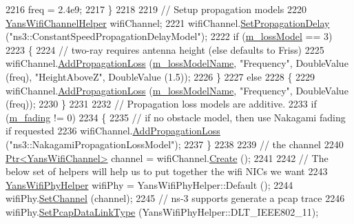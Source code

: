 \begin{DoxyCode}
2216       freq = 2.4e9;
2217     \}
2218 
2219   \textcolor{comment}{// Setup propagation models}
2220   \hyperlink{classns3_1_1YansWifiChannelHelper}{YansWifiChannelHelper} wifiChannel;
2221   wifiChannel.\hyperlink{classns3_1_1YansWifiChannelHelper_a6b452ba53ccaee6ca000cc72ed9ea0fa}{SetPropagationDelay} (\textcolor{stringliteral}{"ns3::ConstantSpeedPropagationDelayModel"});
2222   \textcolor{keywordflow}{if} (\hyperlink{classVanetRoutingExperiment_a6ca0dcdbcabbd60f246855590b4ee4f5}{m\_lossModel} == 3)
2223     \{
2224       \textcolor{comment}{// two-ray requires antenna height (else defaults to Friss)}
2225       wifiChannel.\hyperlink{classns3_1_1YansWifiChannelHelper_a71c64d54e148b43698c65736e1c77156}{AddPropagationLoss} (\hyperlink{classVanetRoutingExperiment_a973b4d1f55f7e425e1564db1cfd503f1}{m\_lossModelName}, \textcolor{stringliteral}{"Frequency"}, 
      DoubleValue (freq), \textcolor{stringliteral}{"HeightAboveZ"}, DoubleValue (1.5));
2226     \}
2227   \textcolor{keywordflow}{else}
2228     \{
2229       wifiChannel.\hyperlink{classns3_1_1YansWifiChannelHelper_a71c64d54e148b43698c65736e1c77156}{AddPropagationLoss} (\hyperlink{classVanetRoutingExperiment_a973b4d1f55f7e425e1564db1cfd503f1}{m\_lossModelName}, \textcolor{stringliteral}{"Frequency"}, 
      DoubleValue (freq));
2230     \}
2231 
2232   \textcolor{comment}{// Propagation loss models are additive.}
2233   \textcolor{keywordflow}{if} (\hyperlink{classVanetRoutingExperiment_acdcef1359860a9bc93e678e15080544f}{m\_fading} != 0)
2234     \{
2235       \textcolor{comment}{// if no obstacle model, then use Nakagami fading if requested}
2236       wifiChannel.\hyperlink{classns3_1_1YansWifiChannelHelper_a71c64d54e148b43698c65736e1c77156}{AddPropagationLoss} (\textcolor{stringliteral}{"ns3::NakagamiPropagationLossModel"});
2237     \}
2238 
2239   \textcolor{comment}{// the channel}
2240   \hyperlink{classns3_1_1Ptr}{Ptr<YansWifiChannel>} channel = wifiChannel.\hyperlink{classns3_1_1YansWifiChannelHelper_a0532e292ab9452f3cf630c848708e563}{Create} ();
2241 
2242   \textcolor{comment}{// The below set of helpers will help us to put together the wifi NICs we want}
2243   \hyperlink{classns3_1_1YansWifiPhyHelper}{YansWifiPhyHelper} wifiPhy =  YansWifiPhyHelper::Default ();
2244   wifiPhy.\hyperlink{classns3_1_1YansWifiPhyHelper_ad2e9a27587dd4ff320435c93cc2676de}{SetChannel} (channel);
2245   \textcolor{comment}{// ns-3 supports generate a pcap trace}
2246   wifiPhy.\hyperlink{classns3_1_1WifiPhyHelper_ae4b90e90f6e78a19c1b7fdf08b270218}{SetPcapDataLinkType} (YansWifiPhyHelper::DLT\_IEEE802\_11);

\end{DoxyCode}
